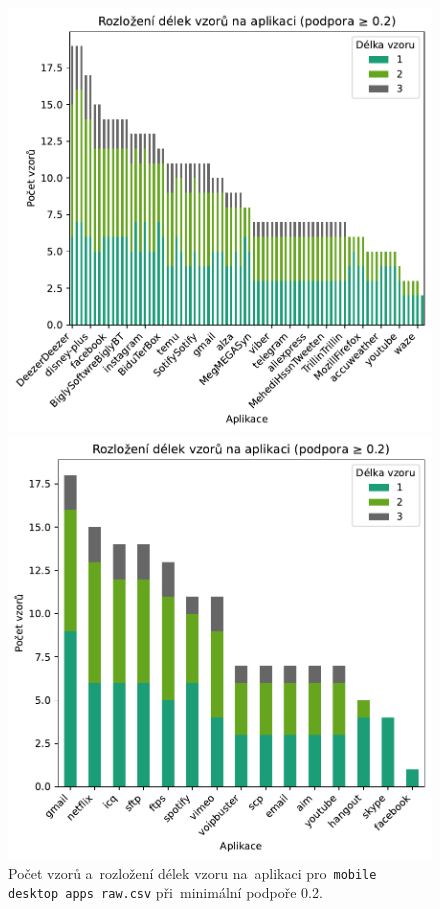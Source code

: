 \begin{figure}[H]
    \centering
    \begin{minipage}[t]{0.49\textwidth}
        \centering
    \includegraphics[width=\linewidth]{obrazky-figures/exps/pattern_lengths_0.2_mobile.pdf}
        \caption{Počet vzorů a~rozložení délek vzoru na~aplikaci pro~\texttt{mobile desktop apps raw.csv} při~minimální podpoře 0.2.}
    \label{fig:appendix-}
    \end{minipage}%
    \hfill
    \begin{minipage}[t]{0.49\textwidth}
       \centering
        \includegraphics[width=\linewidth]{obrazky-figures/exps/pattern_lengths_0.2_iscx.pdf}


\end{minipage}
\end{figure}
